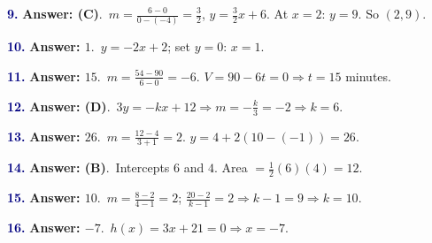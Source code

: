 \documentclass[10pt]{article}
\begin{document}
\begin{minipage}{\linewidth}\textbf{\textcolor{NAVY}{9.}} \textbf{Answer: (C)}.\ $m=\frac{6-0}{0-(-4)}=\frac32$, $y=\frac32x+6$. At $x=2$: $y=9$. So $(2,9)$.\end{minipage}\par\vspace{5pt}
\begin{minipage}{\linewidth}\textbf{\textcolor{NAVY}{10.}} \textbf{Answer: $1$}.\ $y=-2x+2$; set $y=0$: $x=1$.\end{minipage}\par\vspace{5pt}
\begin{minipage}{\linewidth}\textbf{\textcolor{NAVY}{11.}} \textbf{Answer: $15$}.\ $m=\frac{54-90}{6-0}=-6$. $V=90-6t=0\Rightarrow t=15$ minutes.\end{minipage}\par\vspace{5pt}
\begin{minipage}{\linewidth}\textbf{\textcolor{NAVY}{12.}} \textbf{Answer: (D)}.\ $3y=-kx+12\Rightarrow m=-\frac k3=-2\Rightarrow k=6$.\end{minipage}\par\vspace{5pt}
\begin{minipage}{\linewidth}\textbf{\textcolor{NAVY}{13.}} \textbf{Answer: $26$}.\ $m=\frac{12-4}{3+1}=2$. $y=4+2(10-(-1))=26$.\end{minipage}\par\vspace{5pt}
\begin{minipage}{\linewidth}\textbf{\textcolor{NAVY}{14.}} \textbf{Answer: (B)}.\ Intercepts $6$ and $4$. Area $=\frac12(6)(4)=12$.\end{minipage}\par\vspace{5pt}
\begin{minipage}{\linewidth}\textbf{\textcolor{NAVY}{15.}} \textbf{Answer: $10$}.\ $m=\frac{8-2}{4-1}=2$; $\frac{20-2}{k-1}=2\Rightarrow k-1=9\Rightarrow k=10$.\end{minipage}\par\vspace{5pt}
\begin{minipage}{\linewidth}\textbf{\textcolor{NAVY}{16.}} \textbf{Answer: $-7$}.\ $h(x)=3x+21=0\Rightarrow x=-7$.\end{minipage}\par\vspace{5pt}
\end{document}
